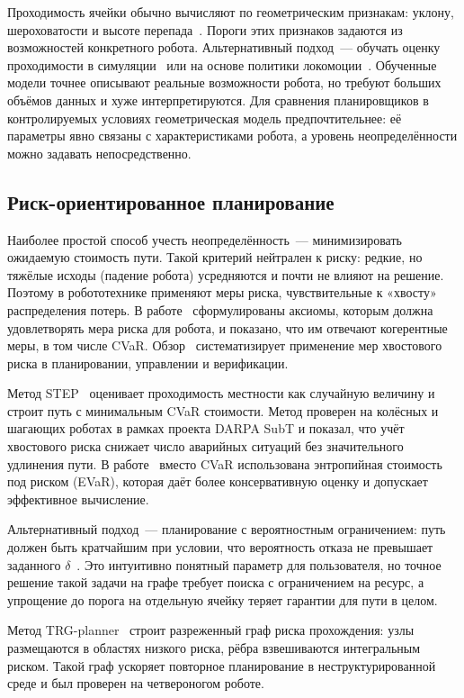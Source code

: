\documentclass{misisarticle}
\begin{document}
Проходимость ячейки обычно вычисляют по геометрическим признакам: уклону, шероховатости и высоте перепада~\cite{wermelinger2016}. Пороги этих признаков задаются из возможностей конкретного робота. Альтернативный подход~--- обучать оценку проходимости в симуляции~\cite{chavez2018} или на основе политики локомоции~\cite{frey2022}. Обученные модели точнее описывают реальные возможности робота, но требуют больших объёмов данных и хуже интерпретируются. Для сравнения планировщиков в контролируемых условиях геометрическая модель предпочтительнее: её параметры явно связаны с характеристиками робота, а уровень неопределённости можно задавать непосредственно.

\subsection{Риск-ориентированное планирование}

Наиболее простой способ учесть неопределённость~--- минимизировать ожидаемую стоимость пути. Такой критерий нейтрален к риску: редкие, но тяжёлые исходы (падение робота) усредняются и почти не влияют на решение. Поэтому в робототехнике применяют меры риска, чувствительные к «хвосту» распределения потерь. В работе~\cite{majumdar2020} сформулированы аксиомы, которым должна удовлетворять мера риска для робота, и показано, что им отвечают когерентные меры, в том числе CVaR. Обзор~\cite{akella2024} систематизирует применение мер хвостового риска в планировании, управлении и верификации.

Метод STEP~\cite{fan2021} оценивает проходимость местности как случайную величину и строит путь с минимальным CVaR стоимости. Метод проверен на колёсных и шагающих роботах в рамках проекта DARPA SubT и показал, что учёт хвостового риска снижает число аварийных ситуаций без значительного удлинения пути. В работе~\cite{dixit2021} вместо CVaR использована энтропийная стоимость под риском (EVaR), которая даёт более консервативную оценку и допускает эффективное вычисление.

Альтернативный подход~--- планирование с вероятностным ограничением: путь должен быть кратчайшим при условии, что вероятность отказа не превышает заданного $\delta$~\cite{blackmore2011}. Это интуитивно понятный параметр для пользователя, но точное решение такой задачи на графе требует поиска с ограничением на ресурс, а упрощение до порога на отдельную ячейку теряет гарантии для пути в целом.

Метод TRG-planner~\cite{lee2025} строит разреженный граф риска прохождения: узлы размещаются в областях низкого риска, рёбра взвешиваются интегральным риском. Такой граф ускоряет повторное планирование в неструктурированной среде и был проверен на четвероногом роботе.
\end{document}
